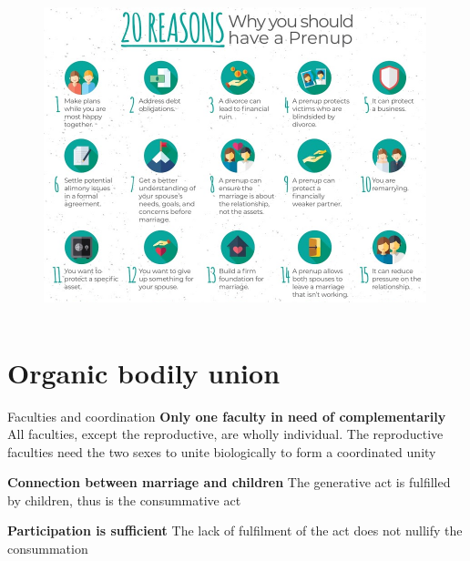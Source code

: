 \documentclass[xcolor=dvipsnames]{beamer}
\begin{document}
\begin{frame}[plain]
  \begin{columns}[T] %
    \begin{column}{0.9\textwidth}
      \begin{figure}[H]
        \centering
        \includegraphics[width=0.99\textwidth]{prenup}
      \end{figure}
    \end{column}%
  \end{columns}
\end{frame}


\section{Organic bodily union}


\begin{frame}{Faculties and coordination}
\textbf{Only one faculty in need of complementarily}\newline
All faculties, except the reproductive, are wholly individual. The reproductive faculties need the two sexes to unite biologically to form a coordinated unity \vspace{10mm}

\textbf{Connection between marriage and children}\newline
The generative act is fulfilled by children, thus is the consummative act \vspace{10mm}

\textbf{Participation is sufficient}\newline
The lack of fulfilment of the act does not nullify the consummation \vspace{10mm}
\end{frame}
\end{document}
